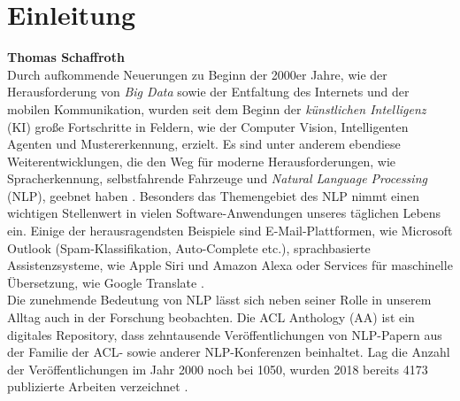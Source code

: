 \documentclass[bachelor,german]{info1thesis}
\begin{document}
\chapter{Einleitung}
\textbf{Thomas Schaffroth} \\
Durch aufkommende Neuerungen zu Beginn der 2000er Jahre, wie der Herausforderung von \textit{Big Data} sowie der Entfaltung des Internets und der mobilen Kommunikation, wurden seit dem Beginn der \textit{künstlichen Intelligenz} (KI) große Fortschritte in Feldern, wie der Computer Vision, Intelligenten Agenten und Mustererkennung, erzielt. Es sind unter anderem ebendiese Weiterentwicklungen, die den Weg für moderne Herausforderungen, wie Spracherkennung, selbstfahrende Fahrzeuge und \textit{Natural Language Processing} (NLP), geebnet haben \cite{Perez2018}.
Besonders das Themengebiet des NLP nimmt einen wichtigen Stellenwert in vielen Software-Anwendungen unseres täglichen Lebens ein. Einige der herausragendsten Beispiele sind E-Mail-Plattformen, wie Microsoft Outlook (Spam-Klassifikation, Auto-Complete etc.), sprachbasierte Assistenzsysteme, wie Apple Siri und Amazon Alexa oder Services für maschinelle Übersetzung, wie Google Translate \cite{Vajjala2020}. \\
Die zunehmende Bedeutung von NLP lässt sich neben seiner Rolle in unserem Alltag auch in der Forschung beobachten. Die ACL Anthology (AA) ist ein digitales Repository, dass zehntausende Veröffentlichungen von NLP-Papern aus der Familie der ACL- sowie anderer NLP-Konferenzen beinhaltet. Lag die Anzahl der Veröffentlichungen im Jahr 2000 noch bei 1050, wurden 2018 bereits 4173 publizierte Arbeiten verzeichnet \cite{Mohammad2019}. \\
\end{document}
